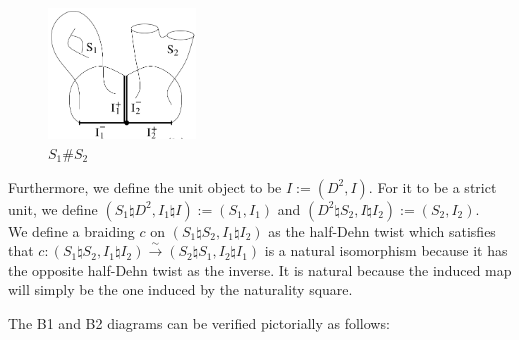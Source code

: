 \documentclass[reqno]{amsart}
\theoremstyle{definition}
\theoremstyle{remark}
\begin{document}
   \begin{figure}[htpb]
       \centering
       \includegraphics[width=0.35\textwidth]{connected-sum.png}
       \caption{$S_1 \# S_2$ \cite[Figure 2]{Wahl-Randal-Williams}}
       \label{fig:connected-sum-png}
   \end{figure}

   Furthermore, we define the unit object to be
   $I := \left( D^2, I \right) $. For it to be a strict unit, 
   we define $\left( S_1 \natural D^2, I_1 \natural I \right) 
   := \left( S_1, I_1 \right) $ and
   $\left( D^2 \natural S_2, I \natural I_2 \right) :=
   \left( S_2, I_2 \right) $.\\
   

   We define a braiding $c$ on
   $\left( S_1 \natural S_2, I_1 \natural I_2 \right) $ 
   as the half-Dehn twist which satisfies that
   $c \colon \left( S_1 \natural S_2, I_1 \natural I_2 \right) 
   \stackrel{\sim}{\to } \left( S_2 \natural S_1, I_2 \natural I_1 \right)  $
   is a natural isomorphism because
   it has the opposite half-Dehn twist as the inverse. It is
   natural because the induced map will simply be the one induced by
   the naturality square.

   The B1 and B2 diagrams can be verified pictorially as follows:
\end{document}
